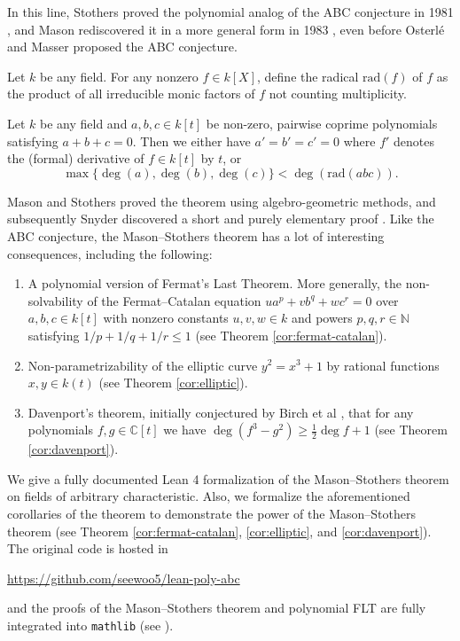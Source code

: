\documentclass[runningheads]{llncs}
\newcommand{\rad}{\mathrm{rad}}
\begin{document}
In this line, Stothers proved the polynomial analog of the ABC conjecture in 1981 \cite{stothers81}, and Mason rediscovered it in a more general form in 1983  \cite{mason84}, even before Osterl\'e and Masser proposed the ABC conjecture.

\begin{definition}
\label{def:radical}
Let $k$ be any field. For any nonzero $f \in k[X]$,  define the radical $\rad (f)$ of $f$ as the product of all irreducible monic factors of $f$ not counting multiplicity.
\end{definition}
\begin{theorem}
\label{thm:Mason--Stothers}
Let $k$ be any field and $a, b, c \in k[t]$ be non-zero, pairwise coprime polynomials satisfying $a + b + c = 0$.
Then we either have $a' = b' = c' = 0$ where $f'$ denotes the (formal) derivative of $f \in k[t]$ by $t$, or
\[
\max\{\deg(a), \deg(b), \deg(c)\} < \deg (\rad(abc)).
\]
\end{theorem}


Mason and Stothers proved the theorem using algebro-geometric methods, and subsequently Snyder discovered a short and purely elementary proof \cite{snyder00}.
Like the ABC conjecture, the Mason--Stothers theorem has a lot of interesting consequences, including the following:
\begin{enumerate}
    \item A polynomial version of Fermat's Last Theorem. More generally, the non-solvability of the Fermat--Catalan equation $ua^p + vb^q + wc^r = 0$ over $a, b, c \in k[t]$ with nonzero constants $u, v, w \in k$ and powers $p, q, r \in \mathbb{N}$ satisfying $1 / p + 1 / q + 1 / r \leq 1$ (see Theorem \ref{cor:fermat-catalan}).
    \item Non-parametrizability of the elliptic curve $y^2 = x^3 + 1$ by rational functions $x, y \in k(t)$ (see Theorem \ref{cor:elliptic}).
    \item Davenport's theorem, initially conjectured by Birch et al \cite{birch65},  that for any polynomials $f, g \in \mathbb{C}[t]$ we have $\deg{(f^3 - g^2)} \geq \frac{1}{2}\deg{f} + 1$ (see Theorem \ref{cor:davenport}).
\end{enumerate}

We give a fully documented Lean 4 formalization of the Mason--Stothers theorem on fields of arbitrary characteristic.
Also, we formalize the aforementioned corollaries of the theorem to demonstrate the power of the Mason--Stothers theorem (see Theorem \ref{cor:fermat-catalan}, \ref{cor:elliptic}, and \ref{cor:davenport}).
The original code is hosted in
\begin{center}
\url{https://github.com/seewoo5/lean-poly-abc}
\end{center}
and the proofs of the Mason--Stothers theorem and polynomial FLT are fully integrated into \texttt{mathlib} (see ).
\end{document}
